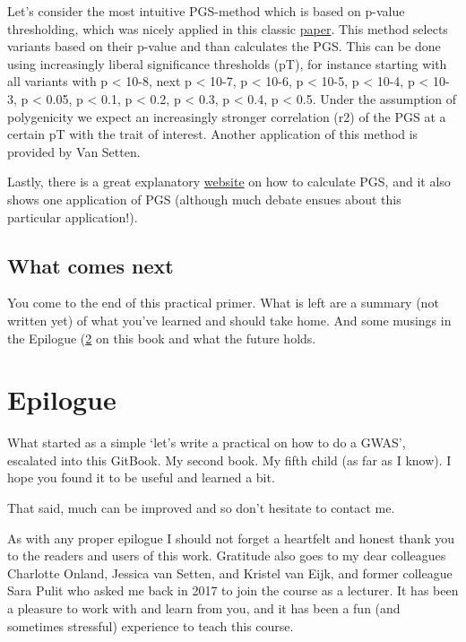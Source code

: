 \documentclass[
]{book}
\begin{document}
Let's consider the most intuitive PGS-method which is based on p-value thresholding, which was nicely applied in this classic \href{https://doi.org/10.1038/nature08185}{paper}. This method selects variants based on their p-value and than calculates the PGS. This can be done using increasingly liberal significance thresholds (pT), for instance starting with all variants with p \textless{} 10-8, next p \textless{} 10-7, p \textless{} 10-6, p \textless{} 10-5, p \textless{} 10-4, p \textless{} 10-3, p \textless{} 0.05, p \textless{} 0.1, p \textless{} 0.2, p \textless{} 0.3, p \textless{} 0.4, p \textless{} 0.5. Under the assumption of polygenicity we expect an increasingly stronger correlation (r2) of the PGS at a certain pT with the trait of interest. Another application of this method is provided by Van Setten\citep{vansetten2015}.

Lastly, there is a great explanatory \href{http://polygenicscores.org/explained/}{website} on how to calculate PGS, and it also shows one application of PGS (although much debate ensues about this particular application!).

\hypertarget{what-comes-next}{%
\section{What comes next}\label{what-comes-next}}

You come to the end of this practical primer. What is left are a summary (not written yet) of what you've learned and should take home. And some musings in the Epilogue (\ref{epilogue} on this book and what the future holds.

\hypertarget{epilogue}{%
\chapter{Epilogue}\label{epilogue}}

What started as a simple `let's write a practical on how to do a GWAS', escalated into this GitBook. My second book. My fifth child (as far as I know). I hope you found it to be useful and learned a bit.

That said, much can be improved and so don't hesitate to contact me.

As with any proper epilogue I should not forget a heartfelt and honest thank you to the readers and users of this work. Gratitude also goes to my dear colleagues Charlotte Onland, Jessica van Setten, and Kristel van Eijk, and former colleague Sara Pulit who asked me back in 2017 to join the course as a lecturer. It has been a pleasure to work with and learn from you, and it has been a fun (and sometimes stressful) experience to teach this course.
\end{document}
